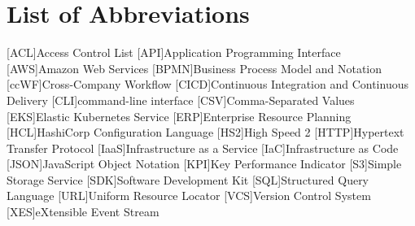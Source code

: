 \chapter*{List of Abbreviations}

\begin{acronym}[BPMN] %

	[ACL]{Access Control List}
	[API]{Application Programming Interface}
	[AWS]{Amazon Web Services}
	[BPMN]{Business Process Model and Notation}
	[ccWF]{Cross-Company Workflow}
	[CICD]{Continuous Integration and Continuous Delivery}
	[CLI]{command-line interface}
	[CSV]{Comma-Separated Values}
	[EKS]{Elastic Kubernetes Service}
	[ERP]{Enterprise Resource Planning}
	[HCL]{HashiCorp Configuration Language}
	[HS2]{High Speed 2}
	[HTTP]{Hypertext Transfer Protocol}
	[IaaS]{Infrastructure as a Service}
	[IaC]{Infrastructure as Code}
	[JSON]{JavaScript Object Notation}
	[KPI]{Key Performance Indicator}
	[S3]{Simple Storage Service}
	[SDK]{Software Development Kit}
	[SQL]{Structured Query Language}
	[URL]{Uniform Resource Locator}
	[VCS]{Version Control System}
	[XES]{eXtensible Event Stream}

\end{acronym}